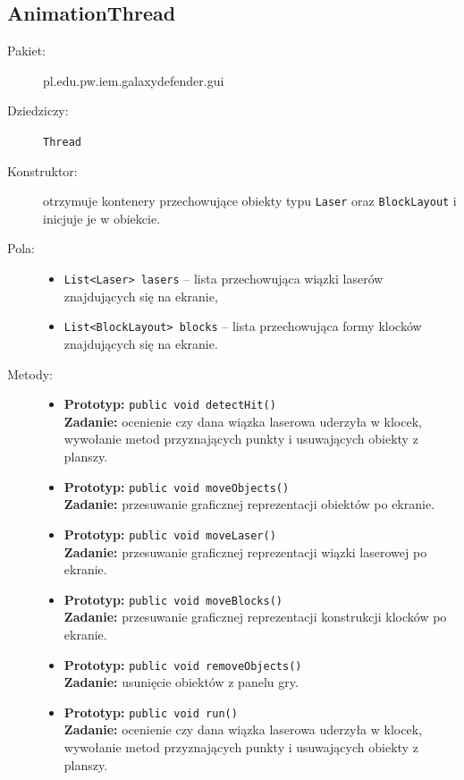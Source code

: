 \documentclass[a4paper]{article}
\newcommand{\prog}{\texttt}
\begin{document}
\subsection{AnimationThread}
\begin{description}
    \item[Pakiet:] pl.edu.pw.iem.galaxydefender.gui
    \item[Dziedziczy:] \prog{Thread}
    \item[Konstruktor:] otrzymuje kontenery przechowujące obiekty typu \prog{Laser} oraz \prog{BlockLayout} i inicjuje je w obiekcie.
    \item[Pola:] \hfill
    \begin{itemize}
        \item \prog{List<Laser> lasers} -- lista przechowująca wiązki laserów znajdujących się na ekranie,
        \item \prog{List<BlockLayout> blocks} -- lista przechowująca formy klocków znajdujących się na ekranie.
    \end{itemize}
    \item[Metody:] \hfill
    \begin{itemize}
        \item \textbf{Prototyp:} \prog{public void detectHit()}\\\textbf{Zadanie:} ocenienie czy dana wiązka laserowa uderzyła w klocek, wywołanie metod przyznających punkty i usuwających obiekty z planszy.
        \item \textbf{Prototyp:} \prog{public void moveObjects()}\\\textbf{Zadanie:} przesuwanie graficznej reprezentacji obiektów po ekranie.
        \item \textbf{Prototyp:} \prog{public void moveLaser()}\\\textbf{Zadanie:} przesuwanie graficznej reprezentacji wiązki laserowej po ekranie.
        \item \textbf{Prototyp:} \prog{public void moveBlocks()}\\\textbf{Zadanie:} przesuwanie graficznej reprezentacji konstrukcji klocków po ekranie.
        \item \textbf{Prototyp:} \prog{public void removeObjects()}\\\textbf{Zadanie:} usunięcie obiektów z panelu gry.
        \item \textbf{Prototyp:} \prog{public void run()}\\\textbf{Zadanie:} ocenienie czy dana wiązka laserowa uderzyła w klocek, wywołanie metod przyznających punkty i usuwających obiekty z planszy.
\end{itemize}
\end{description}
\end{document}
